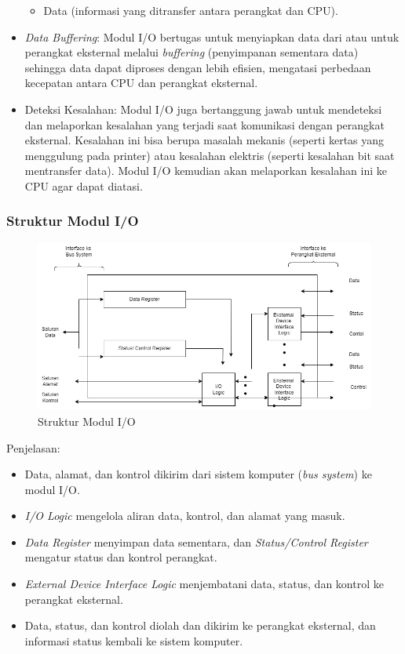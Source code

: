 \documentclass[12pt]{article}
\begin{document}
\begin{itemize}
\begin{itemize}
        \item Data (informasi yang ditransfer antara perangkat dan CPU). 
    \end{itemize} 
    \item \textit{Data Buffering}: Modul I/O bertugas untuk menyiapkan data dari atau untuk perangkat eksternal melalui \textit{buffering }(penyimpanan sementara data) sehingga data dapat diproses dengan lebih efisien, mengatasi perbedaan kecepatan antara CPU dan perangkat eksternal. \item Deteksi Kesalahan: Modul I/O juga bertanggung jawab untuk mendeteksi dan melaporkan kesalahan yang terjadi saat komunikasi dengan perangkat eksternal. Kesalahan ini bisa berupa masalah mekanis (seperti kertas yang menggulung pada printer) atau kesalahan elektris (seperti kesalahan bit saat mentransfer data). Modul I/O kemudian akan melaporkan kesalahan ini ke CPU agar dapat diatasi. 
\end{itemize}

\subsubsection{Struktur Modul I/O} 
\begin{figure}[h] 
    \centering 
    \includegraphics[width=0.80\linewidth]{b_class/asset/sisop.drawio.png} 
    \caption{Struktur Modul I/O} \label{fig} 
\end{figure} 
Penjelasan: 
\begin{itemize} 
    \item Data, alamat, dan kontrol dikirim dari sistem komputer (\textit{bus system}) ke modul I/O. 
    \item \textit{I/O Logic} mengelola aliran data, kontrol, dan alamat yang masuk. 
    \item \textit{Data Register} menyimpan data sementara, dan 
    \textit{Status/Control Register} mengatur status dan kontrol perangkat. 
    \item \textit{External Device Interface Logic} menjembatani data, status, dan kontrol ke perangkat eksternal. 
    \item Data, status, dan kontrol diolah dan dikirim ke perangkat eksternal, dan informasi status kembali ke sistem komputer. 
\end{itemize}
\end{document}

